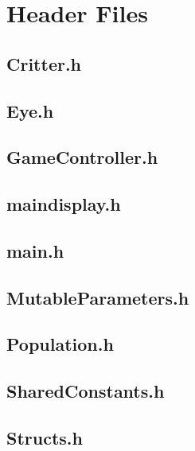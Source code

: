 
\section{Header Files}
\subsection{Critter.h}


\newpage
\subsection{Eye.h}


\newpage
\subsection{GameController.h}


\newpage
\subsection{maindisplay.h}


\newpage
\subsection{main.h}


\newpage
\subsection{MutableParameters.h}


\newpage
\subsection{Population.h}


\newpage
\subsection{SharedConstants.h}


\newpage
\subsection{Structs.h}


